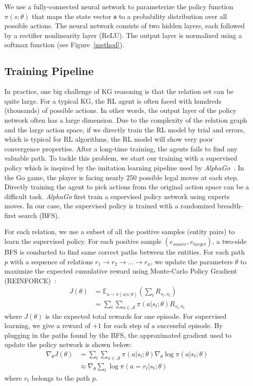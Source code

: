 \documentclass[11pt,letterpaper]{article}
\begin{document}
 We use a fully-connected neural network to parameterize the policy function $\pi(s;\theta)$ that maps the state vector $\mathbf{s}$ to a probability distribution over all possible actions. The neural network consists of two hidden layers, each followed by a rectifier nonlinearity layer (ReLU). The output layer is normalized using a softmax function (see Figure~\ref{method}).

\subsection{Training Pipeline}
\label{subsec:train}
In practice, one big challenge of KG reasoning is that the relation set can be quite large. For a typical KG, the RL agent is often faced with hundreds (thousands) of possible actions. In other words, the output layer of the policy network often has a large dimension. Due to the complexity of the relation graph and the large action space, if we directly train the RL model by trial and errors, which is typical for RL algorithms, the RL model will show very poor convergence properties. After a long-time training, the agents fails to find any valuable path. To tackle this problem, we start our training with a supervised policy which is inspired by the  imitation learning pipeline used by {\em AlphaGo}~\cite{silver2016mastering}. In the Go game, the player is facing nearly 250 possible legal moves at each step. Directly training the agent to pick actions from the original action space can be a difficult task. {\em AlphaGo} first train a supervised policy network using experts moves. In our case, the supervised policy is trained with a randomized breadth-first search (BFS).

 
 For each relation, we use a subset of all the positive samples (entity pairs) to 
learn the supervised policy. For each positive sample $(e_{source},e_{target})$, a two-side BFS is conducted to find same correct paths between the entities. For each path $p$ with a sequence of relations $r_1 \rightarrow r_2 \rightarrow ... \rightarrow r_n$, we update the parameters $\theta$ to maximize the expected cumulative reward using Monte-Carlo Policy Gradient (REINFORCE)~\cite{williams1992simple}:
\begin{align}
J(\theta) &= \mathbb{E}_{a \sim \pi(a|s;\theta)}(\sum_{t}R_{s_t,a_t}) \nonumber \\
		  &= \sum_{t}\sum_{a\in \mathcal{A}}\pi(a|s_t;\theta)R_{s_t,a_t}
\label{eq2}
\end{align}
where $J(\theta)$ is the expected total rewards for one episode. For supervised learning, we give a reward of $+1$ for each step of a successful episode. By plugging in the paths found by the BFS, the approximated gradient used to update the policy network is shown below:
\begin{align}  
\nabla_{\theta}J(\theta) &= \sum_t\sum_{a\in \mathcal{A}}\pi(a|s_t;\theta)\nabla_{\theta}\log{\pi(a|s_t;\theta)} \nonumber \\
&\approx \nabla_{\theta}\sum_t \log{\pi(a=r_t|s_t;\theta)}
\end{align}
where $r_t$ belongs to the path $p$.
\end{document}
